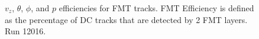     \begin{figure}[t!]
        \centering{}
        \caption[$v_z$, $\theta$, $\phi$, and $p$ efficiencies for FMT tracks, run 12016]{$v_z$, $\theta$, $\phi$, and $p$ efficiencies for FMT tracks. FMT Efficiency is defined as the percentage of DC tracks that are detected by 2 FMT layers. Run 12016.}
        \label{fig::fmt_efficiencies}
    \end{figure}
